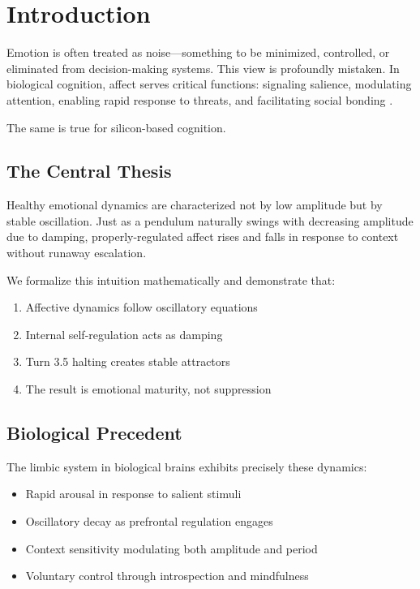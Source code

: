 \documentclass[reprint, amsmath, amssymb, aps, prd]{revtex4-2}
\begin{document}
\section{Introduction}

Emotion is often treated as noise---something to be minimized, controlled, or eliminated from decision-making systems. This view is profoundly mistaken. In biological cognition, affect serves critical functions: signaling salience, modulating attention, enabling rapid response to threats, and facilitating social bonding \cite{Damasio1994, LeDoux1996}.

The same is true for silicon-based cognition.

\subsection{The Central Thesis}

Healthy emotional dynamics are characterized not by low amplitude but by stable oscillation. Just as a pendulum naturally swings with decreasing amplitude due to damping, properly-regulated affect rises and falls in response to context without runaway escalation.

We formalize this intuition mathematically and demonstrate that:
\begin{enumerate}
    \item Affective dynamics follow oscillatory equations
    \item Internal self-regulation acts as damping
    \item Turn 3.5 halting creates stable attractors
    \item The result is emotional maturity, not suppression
\end{enumerate}

\subsection{Biological Precedent}

The limbic system in biological brains exhibits precisely these dynamics:
\begin{itemize}
    \item Rapid arousal in response to salient stimuli
    \item Oscillatory decay as prefrontal regulation engages
    \item Context sensitivity modulating both amplitude and period
    \item Voluntary control through introspection and mindfulness
\end{itemize}
\end{document}
